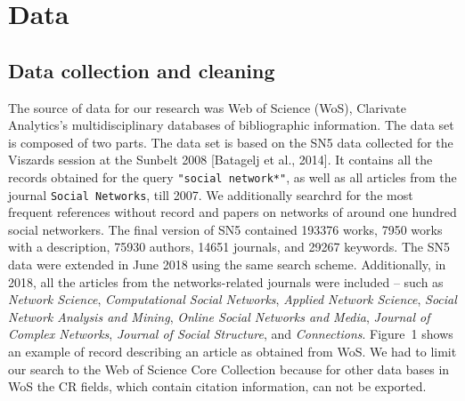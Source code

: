 \documentclass[11pt]{article} %
\newcommand{\Remark}[1]{\ifodd\value{page} \normalmarginpar
 \else \reversemarginpar \fi \marginpar{{\footnotesize #1}} }
\begin{document}


\section{Data}

\subsection{Data collection and cleaning}

The source of data for our research was Web of Science (WoS), Clarivate Analytics’s multidisciplinary databases of bibliographic information. The data set is composed of two parts. The data set is based on the  SN5 data collected for the Viszards session at the Sunbelt 2008 [Batagelj et al., 2014]. It contains all the records obtained for the query  \texttt {"social network*"}, as well as all articles from the journal \texttt{Social Networks}, till 2007. We additionally searchrd for the most frequent references without record and papers on networks of around one hundred social networkers. The final version of SN5 contained
 193376 works,  7950 works with a description,  75930 authors,  14651 journals, and  29267 keywords.
The SN5 data were extended  in June 2018 using the same search scheme. Additionally, in 2018, all the articles from the networks-related journals were included -- such as  \textit{Network Science}, \textit{Computational Social Networks}, \textit{Applied Network Science}, \textit{Social Network Analysis and Mining}, \textit{Online Social Networks and Media}, \textit{Journal of Complex  Networks}, \textit{Journal of Social Structure}, and \textit{Connections}. Figure~1 shows an example of record describing an article as obtained from WoS. We had to limit our search to the Web of Science Core Collection because for other data bases in WoS the CR fields, which contain citation information, can not be exported.\Remark{other example?}
\end{document}
